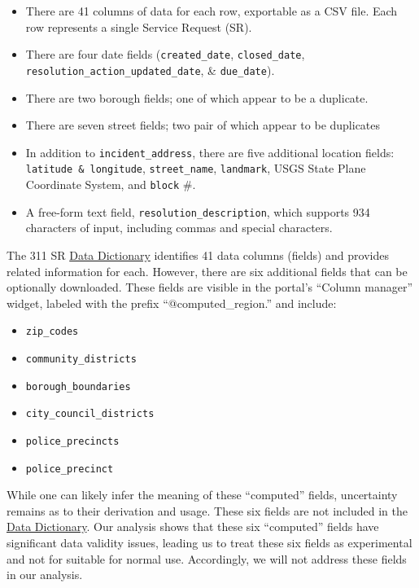 \documentclass[linenumber]{jdsart}
\begin{document}
\begin{itemize}
	\item There are 41 columns of data for each row, exportable as a CSV file.
	Each row represents a single Service Request (SR). 
	
	\item There are four date fields 
	(\texttt{created\_date}, \texttt{closed\_date}, \texttt{resolution\_action\_updated\_date}, \& \texttt{due\_date}).
	
	\item There are two borough fields; one of which appear to be a duplicate.
		
	\item There are seven street fields; two pair of which appear to be duplicates
	
	\item In addition to  \texttt{incident\_address}, there are five additional location fields: 
	\texttt{latitude \& longitude}, \texttt{street\_name}, \texttt{landmark}, USGS State Plane 
	Coordinate System, and \texttt{block} \#.
	
	\item A free\mbox{-}form text field, \texttt{resolution\_description}, which 
	supports 934 characters of input, including commas and special characters.
\end{itemize}

The 311 SR 
\href{https://data.cityofnewyork.us/api/views/erm2-nwe9/files/b372b884-f86a-453b-ba16-1fe06ce9d212?download=true&filename=311_ServiceRequest_2010-Present_DataDictionary_Updated_2023.xlsx}{Data Dictionary} 
identifies 41 data columns (fields) and provides related information 
for each. However, there are six additional fields that can be
optionally downloaded. These fields are 
visible in the portal's ``Column manager'' widget, labeled with the prefix 
``@computed\_region.'' and include:

\begin{itemize}
    \item \texttt{zip\_codes}
    \item \texttt{community\_districts}
    \item \texttt{borough\_boundaries}
    \item \texttt{city\_council\_districts}
    \item \texttt{police\_precincts}
    \item \texttt{police\_precinct}
\end{itemize}

While one can likely infer the meaning of these ``computed'' 
fields, uncertainty remains as to their derivation and 
usage. These six fields are not included in
the \href{https://data.cityofnewyork.us/api/views/erm2-nwe9/files/b372b884-f86a-453b-ba16-1fe06ce9d212?download=true&filename=311_ServiceRequest_2010-Present_DataDictionary_Updated_2023.xlsx}{Data Dictionary}. Our 
analysis shows that these six ``computed'' fields have 
significant data validity issues, leading us to treat these six fields 
as experimental and not for suitable for normal use. Accordingly, 
we will not address these fields in our analysis. 
\end{document}
